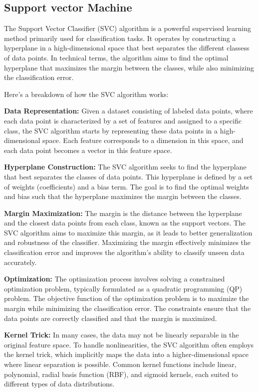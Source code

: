 \documentclass[preprint,aps,nofootinbib,a4paper,superscriptaddress,longbibliography,amsfonts,amssymb,amsmath,titlepage]{revtex4-2}
\begin{document}
\subsection{Support vector Machine}

The Support Vector Classifier (SVC) algorithm is a powerful supervised learning method primarily used for classification tasks. It operates by constructing a hyperplane in a high-dimensional space that best separates the different classess of data points. In technical terms, the algorithm aims to find the optimal hyperplane that maximizes the margin between the classes, while also minimizing the classification error.

Here's a breakdown of how the SVC algorithm works:

\textbf{Data Representation:} Given a dataset consisting of labeled data points, where each data point is characterized by a set of features and assigned to a specific class, the SVC algorithm starts by representing these data points in a high-dimensional space. Each feature corresponds to a dimension in this space, and each data point becomes a vector in this feature space.

\textbf{Hyperplane Construction:} The SVC algorithm seeks to find the hyperplane that best separates the classes of data points. This hyperplane is defined by a set of weights (coefficients) and a bias term. The goal is to find the optimal weights and bias such that the hyperplane maximizes the margin between the classes.

\textbf{Margin Maximization:} The margin is the distance between the hyperplane and the closest data points from each class, known as the support vectors. The SVC algorithm aims to maximize this margin, as it leads to better generalization and robustness of the classifier. Maximizing the margin effectively minimizes the classification error and improves the algorithm's ability to classify unseen data accurately.

\textbf{Optimization:} The optimization process involves solving a constrained optimization problem, typically formulated as a quadratic programming (QP) problem. The objective function of the optimization problem is to maximize the margin while minimizing the classification error. The constraints ensure that the data points are correctly classified and that the margin is maximized.

\textbf{Kernel Trick:} In many cases, the data may not be linearly separable in the original feature space. To handle nonlinearities, the SVC algorithm often employs the kernel trick, which implicitly maps the data into a higher-dimensional space where linear separation is possible. Common kernel functions include linear, polynomial, radial basis function (RBF), and sigmoid kernels, each suited to different types of data distributions.
\end{document}
